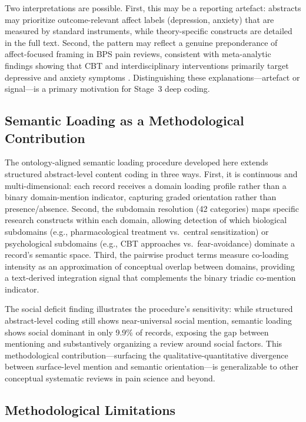 \documentclass[11pt]{article}
\begin{document}
Two interpretations are possible. First, this may be a reporting artefact: abstracts may prioritize outcome-relevant affect labels (depression, anxiety) that are measured by standard instruments, while theory-specific constructs are detailed in the full text. Second, the pattern may reflect a genuine preponderance of affect-focused framing in BPS pain reviews, consistent with meta-analytic findings showing that CBT and interdisciplinary interventions primarily target depressive and anxiety symptoms \citep{morley1999, williams2020}. Distinguishing these explanations---artefact or signal---is a primary motivation for Stage~3 deep coding.

\subsection{Semantic Loading as a Methodological Contribution}

The ontology-aligned semantic loading procedure developed here extends structured abstract-level content coding in three ways. First, it is continuous and multi-dimensional: each record receives a domain loading profile rather than a binary domain-mention indicator, capturing graded orientation rather than presence/absence. Second, the subdomain resolution (42 categories) maps specific research constructs within each domain, allowing detection of which biological subdomains (e.g., pharmacological treatment vs.\ central sensitization) or psychological subdomains (e.g., CBT approaches vs.\ fear-avoidance) dominate a record's semantic space. Third, the pairwise product terms measure co-loading intensity as an approximation of conceptual overlap between domains, providing a text-derived integration signal that complements the binary triadic co-mention indicator.

The social deficit finding illustrates the procedure's sensitivity: while structured abstract-level coding still shows near-universal social mention, semantic loading shows social dominant in only 9.9\% of records, exposing the gap between mentioning and substantively organizing a review around social factors. This methodological contribution---surfacing the qualitative-quantitative divergence between surface-level mention and semantic orientation---is generalizable to other conceptual systematic reviews in pain science and beyond.

\subsection{Methodological Limitations}
\end{document}
